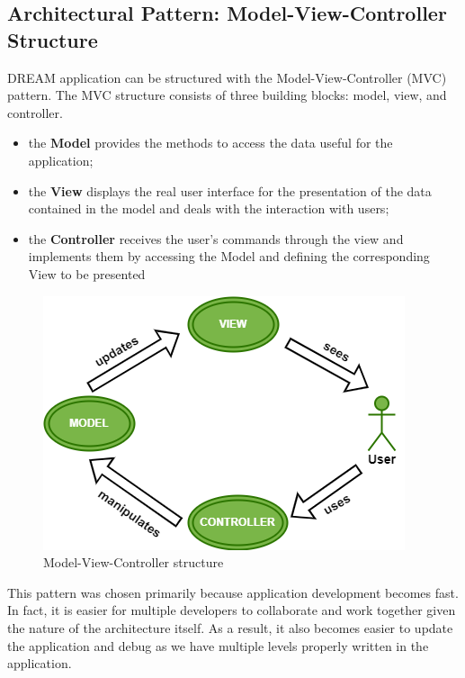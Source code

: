 \subsection{Architectural Pattern: Model-View-Controller Structure}
DREAM application can be structured with the Model-View-Controller (MVC) pattern.
The MVC structure consists of three building blocks: model, view, and controller.
\begin{itemize}
    \item the \textbf{Model} provides the methods to access the data useful for the application;
    \item the \textbf{View} displays the real user interface for the presentation of the data contained in the model and deals with the interaction with users;
    \item the \textbf{Controller} receives the user's commands through the view and implements them by accessing the Model and defining the corresponding View to be presented
\end{itemize}

\begin{figure}[H]
  \centering
  \includegraphics[scale=0.7]{./Images/MVC.png}
  \caption{Model-View-Controller structure}
\end{figure}

This pattern was chosen primarily because application development becomes fast. In fact, it is easier for multiple developers to collaborate and work together given the nature of the architecture itself.
As a result, it also becomes easier to update the application and debug as we have multiple levels properly written in the application.